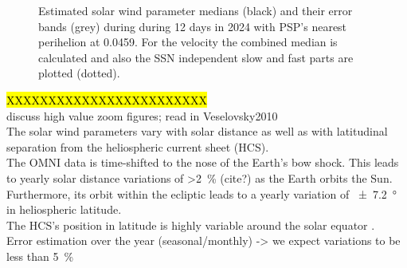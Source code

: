 \begin{figure}
	\caption{Estimated solar wind parameter medians (black) and their error bands (grey) during during 12 days in 2024 with PSP's nearest perihelion at \SI{0.0459}{\au}. For the velocity the combined median is calculated and also the SSN independent slow and fast parts are plotted (dotted).}
	\label{fig:SPP_perihelia_prediction_nearest_e_plot}
\end{figure}




\hl{XXXXXXXXXXXXXXXXXXXXXXXX}\\

discuss high value zoom figures; read in Veselovsky2010\\

The solar wind parameters vary with solar distance as well as with latitudinal separation from the heliospheric current sheet (HCS).\\
The OMNI data is time-shifted to the nose of the Earth's bow shock. This leads to yearly solar distance variations of \SI{>2}{\percent} (cite?) as the Earth orbits the Sun. Furthermore, its orbit within the ecliptic leads to a yearly variation of \SI{+-7.2}{\degree} in heliospheric latitude.\\
The HCS's position in latitude is highly variable around the solar equator \citep[p.~127~ff.?]{Schwenn1990}.\\

Error estimation over the year (seasonal/monthly) -> we expect variations to be less than 5~\%\\


